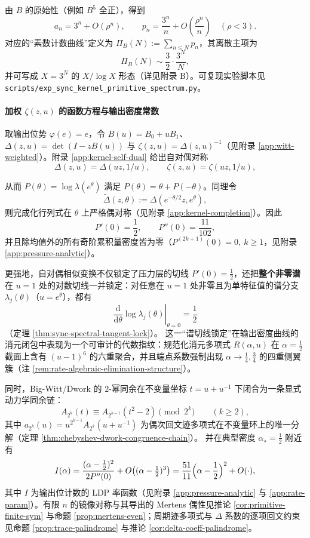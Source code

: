 由 $B$ 的原始性（例如 $B^5$ 全正），得到
\[
a_n=3^n+O(\rho^n),\qquad
p_n=\frac{3^n}{n}+O\!\left(\frac{\rho^n}{n}\right)\quad(\rho<3).
\]
对应的“素数计数曲线”定义为 $\Pi_B(N):=\sum_{n\le N}p_n$，其离散主项为
\[
\Pi_B(N)\sim \frac{3}{2}\cdot \frac{3^N}{N},
\]
并可写成 $X=3^N$ 的 $X/\log X$ 形态（详见附录 B）。可复现实验脚本见 \texttt{scripts/exp\_sync\_kernel\_primitive\_spectrum.py}。

\paragraph{加权 $\zeta(z,u)$ 的函数方程与输出密度常数}
取输出位势 $\varphi(e)=e$，令 $B(u)=B_0+uB_1$、$\Delta(z,u)=\det(I-zB(u))$ 与 $\zeta(z,u)=\Delta(z,u)^{-1}$（见附录 \ref{app:witt-weighted}）。附录 \ref{app:kernel-self-dual} 给出自对偶对称
\[
\Delta(z,u)=\Delta(uz,1/u),\qquad
\zeta(z,u)=\zeta(uz,1/u),
\]


从而 $P(\theta)=\log\lambda(e^\theta)$ 满足 $P(\theta)=\theta+P(-\theta)$。同理令
\[
\widetilde{\Delta}(z,\theta):=\Delta(e^{-\theta/2}z,e^\theta),
\]
则完成化行列式在 $\theta$ 上严格偶对称（见附录 \ref{app:kernel-completion}）。因此
\[
P'(0)=\frac12,\qquad P''(0)=\frac{11}{102},
\]
并且除均值外的所有奇阶累积量密度皆为零（$P^{(2k+1)}(0)=0,\ k\ge 1$，见附录 \ref{app:pressure-analytic}）。
\par
更强地，自对偶相似变换不仅锁定了压力层的切线 \(P'(0)=\tfrac12\)，还把\textbf{整个非零谱}在 \(u=1\) 处的对数切线一并锁定：对任意在 \(u=1\) 处非零且为单特征值的谱分支 \(\lambda_j(\theta)\)（\(u=e^\theta\)），都有
\[
\left.\frac{\mathrm{d}}{\mathrm{d}\theta}\log\lambda_j(\theta)\right|_{\theta=0}=\frac12
\]
（定理 \ref{thm:sync-spectral-tangent-lock}）。
这一“谱切线锁定”在输出密度曲线的消元闭包中表现为一个可审计的代数指纹：规范化消元多项式 \(R(\alpha,u)\) 在 \(\alpha=\tfrac12\) 截面上含有 \((u-1)^6\) 的六重聚合，并且端点系数强制出现 \(\alpha\to\tfrac14,\tfrac34\) 的四重侧翼簇（注 \ref{rem:rate-algebraic-elimination-structure}）。
\par
同时，Big-Witt/Dwork 的 \(2\)-幂同余在不变量坐标 \(t=u+u^{-1}\) 下闭合为一条显式动力学同余链：
\[
A_{2^k}(t)\equiv A_{2^{k-1}}(t^2-2)\pmod{2^k}\qquad(k\ge 2),
\]
其中 \(a_{2^k}(u)=u^{2^{k-1}}A_{2^k}(u+u^{-1})\) 为偶次回文迹多项式在不变量环上的唯一分解（定理 \ref{thm:chebyshev-dwork-congruence-chain}）。
并在典型密度 $\alpha_\star=\frac12$ 附近有
\[
I(\alpha)=\frac{(\alpha-\frac12)^2}{2P''(0)}+O\!\left((\alpha-\tfrac12)^3\right)
=\frac{51}{11}\Bigl(\alpha-\frac12\Bigr)^2+O(\cdot),
\]
其中 $I$ 为输出位计数的 LDP 率函数（见附录 \ref{app:pressure-analytic} 与 \ref{app:rate-param}）。有限 $n$ 的镜像对称与其导出的 Mertens 偶性见推论 \ref{cor:primitive-finite-sym} 与命题 \ref{prop:mertens-even}；周期迹多项式与 $\Delta$ 系数的逐项回文约束见命题 \ref{prop:trace-palindrome} 与推论 \ref{cor:delta-coeff-palindrome}。

